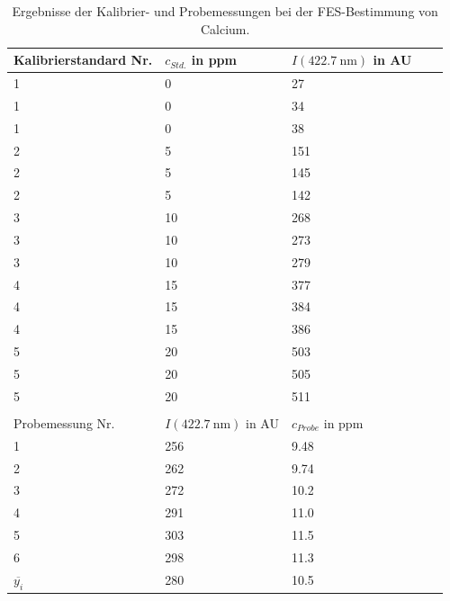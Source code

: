  \begin{table}[H]
    \centering
    \caption[Ergebnisse der FES-Bestimmung von Calcium, Quelle: Autor]{Ergebnisse der Kalibrier- und Probemessungen bei der FES-Bestimmung von Calcium.}
    
    \label{tab:ErgebnisseFES}
    \begin{tabular}{@{}ll|lp{4.5cm}l@{}}
      \toprule
      Kalibrierstandard Nr. & $c_{Std.}$ in \si{ppm} & $I\left(\SI[mode=text]{422.7}{\nano\meter}\right)$ in AU \\ \midrule
        1 & 0 & 27 \\
        1 & 0 & 34 \\
        1 & 0 & 38 \\
        2 & 5 & 151 \\
        2 & 5 & 145 \\
        2 & 5 & 142 \\
        3 & 10 & 268 \\
        3 & 10 & 273 \\
        3 & 10 & 279 \\
        4 & 15 & 377 \\
        4 & 15 & 384 \\
        4 & 15 & 386 \\
        5 & 20 & 503 \\
        5 & 20 & 505 \\
        5 & 20 & 511 \\ 
          &  &  \\
      \toprule
      Probemessung Nr. & $I\left(\SI[mode=text]{422.7}{\nano\meter}\right)$ in AU & $c_{Probe}$ in \si{ppm} \\ \midrule
        1 & 256 & 9.48 \\
        2 & 262 & 9.74 \\
        3 & 272 & 10.2 \\ 
        4 & 291 & 11.0 \\
        5 & 303 & 11.5 \\ 
        6 & 298 & 11.3 \\ \midrule          
        $\overline{y_i}$ & 280 & 10.5 \\ \bottomrule
    \end{tabular}
  \end{table}
  
  

